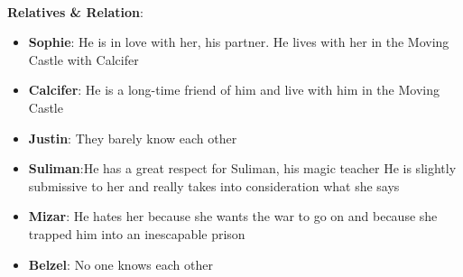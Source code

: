 



\\
\textbf{Relatives \& Relation}:
\begin{itemize}
\item \textbf{Sophie}: He is in love with her, his partner. He lives with her in the Moving Castle
        with Calcifer
\item \textbf{Calcifer}: He is a long-time friend of him and live with him in the Moving Castle
\item \textbf{Justin}: They barely know each other
\item \textbf{Suliman}:He has a great respect for Suliman, his magic teacher
             He is slightly submissive to her and really takes into consideration what she says
\item \textbf{Mizar}: He hates her because she wants the war to go on and because she trapped him into an inescapable prison 
\item \textbf{Belzel}: No one knows each other
\end{itemize}

